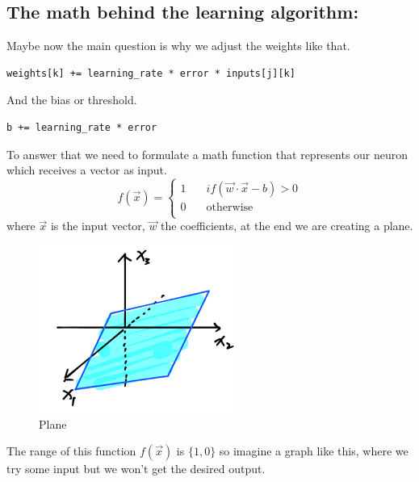 \documentclass[12pt]{article}
\begin{document}
\subsection{The math behind the learning algorithm:}
Maybe now the main question is why we adjust the weights like that.
\begin{verbatim}
weights[k] += learning_rate * error * inputs[j][k]
\end{verbatim}
And the bias or threshold.
\begin{verbatim}
b += learning_rate * error
\end{verbatim}
To answer that we need to formulate a math function that represents our neuron which receives a vector
as input.
\[
  f(\vec{x}) = 
  \begin{cases}
    1 &\quad if (\vec{w} \cdot \vec{x} - b) > 0  \\
    0 &\quad \text{otherwise} \\
  \end{cases}
\]
where $\vec{x}$ is the input vector, $\vec{w}$ the coefficients, at the end we are creating a plane.
\begin{figure}[h]
  \centering
  \includegraphics[scale = 0.98]{plane.png}
  \caption{Plane}
\end{figure}

The range of this function $f(\vec{x})$ is $\{1, 0\}$ so imagine a graph like this, where we try
some input but we won't get the desired output.

\end{document}
